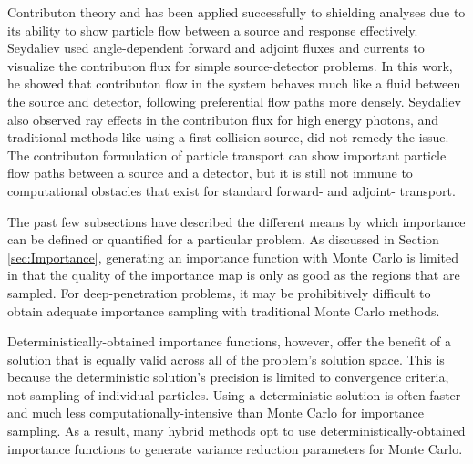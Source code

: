 Contributon theory and has been applied successfully to
shielding analyses \cite{seydaliev_contributon_2008, williams_SCC_shielding} due
to its ability to show particle flow between a source and response effectively.
Seydaliev \cite{seydaliev_contributon_2008} used angle-dependent forward and
adjoint
fluxes and currents to visualize the contributon flux for
simple source-detector problems. In this work, he showed that contributon flow
in the system behaves much like a fluid between the source and detector,
following preferential flow paths more densely.
Seydaliev also observed ray effects in the
contributon flux for high energy photons, and traditional methods like using a
first collision source, did not remedy the issue. The contributon formulation of
particle transport can show important particle flow paths between a source and a
detector, but it is still not immune to computational obstacles that exist for
standard forward- and adjoint- transport.

The past few subsections have described the different means by which importance
can be defined or quantified for a particular problem.
As discussed in Section \ref{sec:Importance}, generating an importance function
with Monte Carlo is limited in that the quality of the importance map is only as
good as the regions that are sampled. For deep-penetration problems, it may be
prohibitively difficult to obtain adequate importance sampling with traditional
Monte Carlo methods. 

Deterministically-obtained importance functions, however,
offer the benefit of a solution that is equally valid across all of the problem's
solution space. This is because the deterministic solution's precision is
limited to convergence criteria, not sampling of individual particles. Using a
deterministic solution is often faster and much less computationally-intensive
than Monte Carlo for importance sampling. As a result, many hybrid methods opt
to use deterministically-obtained importance functions to generate variance
reduction parameters for Monte Carlo.
